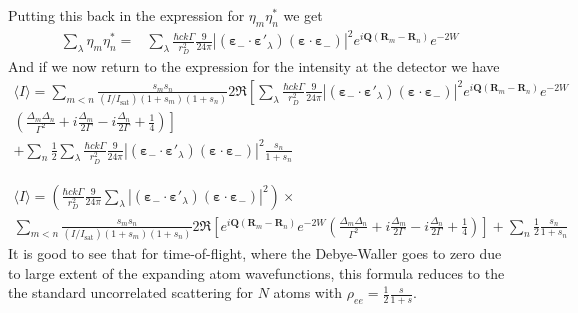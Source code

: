 \documentclass[11pt,letter]{article}
\newcommand{\bv}[1]{\ensuremath{\bm{#1}}}
\begin{document}
Putting this back in the expression for $\eta_{m}\eta_{n}^{*}$ we get
\begin{equation}
\begin{split}
 \sum_{\lambda } \eta_{m}\eta_{n}^{*} = & 
 \sum_{\lambda } \frac{\hbar c k \Gamma}{r_{D}^{2}}  
    \frac{9}{24\pi} 
       | (\bv{\varepsilon}_{-}\cdot \bv{\varepsilon}'_{\lambda} )
                       (\bv{\varepsilon}\cdot \bv{\varepsilon}_{-} ) |^{2}
       e^{ i \bv{Q}( \bv{R}_{m} - \bv{R}_{n} ) } e^{-2W} 
\end{split}
\end{equation}
And if we now return to the expression for the intensity at the detector we have 
\begin{multline}
\langle I \rangle = 
  \sum_{m<n} 
    \frac{ s_{m} s_{n} } { (I/I_{\mathrm{sat}}) ( 1+s_{m} )( 1+s_{n} ) }
    2 \Re\left[ 
         \sum_{\lambda } \frac{\hbar c k \Gamma}{r_{D}^{2}}  
            \frac{9}{24\pi} 
               | (\bv{\varepsilon}_{-}\cdot \bv{\varepsilon}'_{\lambda} )
                               (\bv{\varepsilon}\cdot \bv{\varepsilon}_{-} ) |^{2}
               e^{ i \bv{Q}( \bv{R}_{m} - \bv{R}_{n} ) } e^{-2W} \right. \\ 
    \left.
    \left(
        \frac{ \Delta_{m} \Delta_{n} }{ \Gamma^{2} } 
      + i \frac{ \Delta_{m} }{ 2 \Gamma } 
      - i \frac{ \Delta_{n} }{ 2 \Gamma } 
      + \frac{1}{4}  
    \right) \right] \\ 
  + \sum_{n}  \frac{1}{2}
    \sum_{\lambda} \frac{\hbar c k \Gamma}{r_{D}^{2}}  
    \frac{9}{24\pi} 
       | (\bv{\varepsilon}_{-}\cdot \bv{\varepsilon}'_{\lambda} )
                       (\bv{\varepsilon}\cdot \bv{\varepsilon}_{-} ) |^{2} 
    \frac{ s_{n} } { 1 + s_{n} } 
\end{multline}

\begin{multline}
\langle I \rangle =
 \left( 
 \frac{\hbar c k \Gamma}{r_{D}^{2}}  
     \frac{9}{24\pi} 
  \sum_{\lambda }
        | (\bv{\varepsilon}_{-}\cdot \bv{\varepsilon}'_{\lambda} )
                        (\bv{\varepsilon}\cdot \bv{\varepsilon}_{-} ) |^{2} 
  \right) \times \\
  \sum_{m<n} 
    \frac{ s_{m} s_{n} } { (I/I_{\mathrm{sat}}) ( 1+s_{m} )( 1+s_{n} ) }
    2 \Re\left[ 
               e^{ i \bv{Q}( \bv{R}_{m} - \bv{R}_{n} ) } e^{-2W}  
    \left(
        \frac{ \Delta_{m} \Delta_{n} }{ \Gamma^{2} } 
      + i \frac{ \Delta_{m} }{ 2 \Gamma } 
      - i \frac{ \Delta_{n} }{ 2 \Gamma } 
      + \frac{1}{4}  
    \right) \right]  
  + \sum_{n}  \frac{1}{2}
    \frac{ s_{n} } { 1 + s_{n} } 
\end{multline}
It is good to see that for time-of-flight, where the Debye-Waller goes to zero due to large extent of the expanding atom wavefunctions,  this formula reduces to the the standard uncorrelated scattering for $N$ atoms with $\rho_{ee} = \frac{1}{2} \frac{s}{1+s}$.
\end{document}
